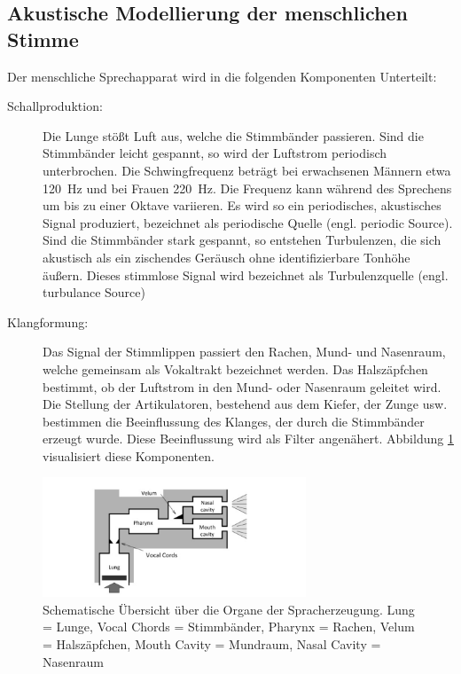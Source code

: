 \subsection{Akustische Modellierung der menschlichen Stimme}
\label{sec:theVoice}

Der menschliche Sprechapparat wird in die folgenden Komponenten Unterteilt:

\begin{description}

\item[Schallproduktion: ] Die Lunge stößt Luft aus, welche die Stimmbänder passieren. Sind die Stimmbänder leicht gespannt, so wird der Luftstrom periodisch unterbrochen. Die Schwingfrequenz beträgt bei erwachsenen Männern etwa \SI{120}{\hertz} und bei Frauen \SI{220}{\hertz}. Die Frequenz kann während des Sprechens um bis zu einer Oktave variieren. Es wird so ein periodisches, akustisches Signal produziert, bezeichnet als \glqq periodische Quelle\grqq{} (engl. \glqq periodic Source\grqq). Sind die Stimmbänder stark gespannt, so entstehen Turbulenzen, die sich akustisch als ein zischendes Geräusch ohne identifizierbare Tonhöhe äußern. Dieses stimmlose Signal wird bezeichnet als \glqq Turbulenzquelle\grqq{} (engl. \glqq turbulance Source\grqq)
\item[Klangformung: ] Das Signal der Stimmlippen passiert den Rachen, Mund- und Nasenraum, welche gemeinsam als \glqq Vokaltrakt\grqq{} bezeichnet werden. Das Halszäpfchen bestimmt, ob der Luftstrom in den Mund- oder Nasenraum geleitet wird. Die Stellung der Artikulatoren, bestehend aus dem Kiefer, der Zunge usw. bestimmen die Beeinflussung des Klanges, der durch die Stimmbänder erzeugt wurde. Diese Beeinflussung wird als Filter angenähert. \cite[S. 62]{cryModel} \cite[S. 13]{sprachverarbeitung} Abbildung \ref{img:schematicVocalOrgans} visualisiert diese Komponenten.
\end{description}

\begin{figure}[h]
	\centering
	\includegraphics[width=0.7\textwidth]{bilder/SchematicVocalOrgans.png}
	\caption{Schematische Übersicht über die Organe der Spracherzeugung. Lung = Lunge, Vocal Chords = Stimmbänder, Pharynx = Rachen, Velum = Halszäpfchen, Mouth Cavity = Mundraum, Nasal Cavity = Nasenraum \cite{speechProduction}}
	\label{img:schematicVocalOrgans}
\end{figure}	

